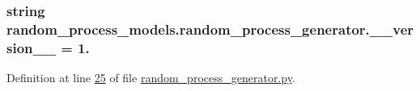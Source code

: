 \subsubsection[{\+\_\+\+\_\+version\+\_\+\+\_\+}]{\setlength{\rightskip}{0pt plus 5cm}string random\+\_\+process\+\_\+models.\+random\+\_\+process\+\_\+generator.\+\_\+\+\_\+version\+\_\+\+\_\+ = \textquotesingle{}1.\textquotesingle{}}\label{namespacerandom__process__models_1_1random__process__generator_ab646d91986add5570041ec883e29d8da}


Definition at line \hyperlink{random__process__generator_8py_source_l00025}{25} of file \hyperlink{random__process__generator_8py_source}{random\+\_\+process\+\_\+generator.\+py}.

